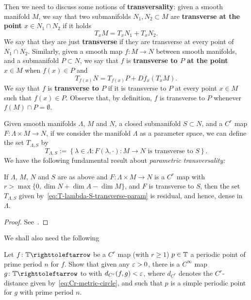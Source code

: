 Then we need to discuss some notions of \textbf{transversality}: given a smooth manifold $M$, we say that two submanifolds $N_1,N_2\subset M$ are \textbf{transverse at the point $x\in N_1\cap N_2$} if it holds
\begin{displaymath}
  T_xM=T_xN_1 + T_xN_2.
\end{displaymath}
We say that they are just \textbf{transverse} if they are transverse at every point of $N_1\cap N_2$. Similarly, given a smooth map $f\colon M\to N$ between smooth manifolds, and a submanifold $P\subset N$, we say that $f$ is \textbf{transverse to $P$ at the point $x\in M$} when $f(x)\in P$ and
\begin{displaymath}
  T_{f(x)}N=T_{f(x)}P + Df_x(T_xM).
\end{displaymath}
We say that $f$ is \textbf{transverse to $P$} if it is transverse to $P$ at every point $x\in M$ such that $f(x)\in P$. Observe that, by definition, $f$ is transverse to $P$ whenever $f(M)\cap P=\emptyset$.

Given smooth manifolds $\Lambda$, $M$ and $N$, a closed submanifold $S\subset N$, and a $C^r$ map $F\colon \Lambda\times M\to N$, if we consider the manifold $\Lambda$ as a parameter space, we can define the set $T_{\Lambda,S}$ by
\begin{equation}
  \label{eq:T-lambda-S-transverse-param}
  T_{\Lambda,S}:=\left\{\lambda\in\Lambda  : F(\lambda,\cdot )\colon M\to N \text{ is transverse to } S\right\}.
\end{equation}
We have the following fundamental result about \emph{parametric transversality:}

\begin{theorem}
  \label{thm:transversality-parametric}
  If $\Lambda$, $M$, $N$ and $S$ are as above and $F\colon\Lambda\times M\to N$ is a $C^r$ map with $r>\max\{0,\dim N+\dim A-\dim M\}$, and $F$ is transverse to $S$, then the set $T_{\Lambda,S}$ given by~\eqref{eq:T-lambda-S-transverse-param} is residual, and hence, dense in $\Lambda$.
\end{theorem}

\begin{proof}
  See~\cite[Theorem 2.7]{HirschDiffTopology}.
\end{proof}

We shall also need the following

\begin{exercise}
  \label{exer:simple-periodic-points-perturbation}
  Let $f\colon\T\carr$ be a $C^r$ map (with $r\geq 1$) $p\in\mathbb{T}$ a periodic point of prime period $n$ for $f$. Show that given any $\varepsilon>0$, there is a $C^\infty$ map $g\colon\T\carr$ to with $d_{C^r}(f,g)<\varepsilon$, where $d_{C^r}$ denotes the $C^r$-distance given by~\eqref{eq:Cr-metric-circle}, and such that $p$ is a simple periodic point for $g$ with prime period $n$.
\end{exercise}

